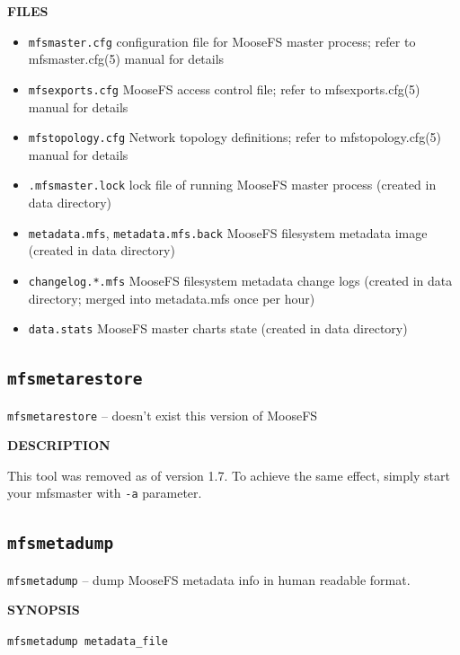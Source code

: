 \documentclass[a4paper,11pt,english]{report}
\def\code#1{\texttt{#1}}
\begin{document}
				\bigskip
				\textbf{FILES}
				\begin{itemize}
					\item \code{mfsmaster.cfg}
						configuration file for MooseFS master process; refer to
						mfsmaster.cfg(5) manual for details

					\item \code{mfsexports.cfg}
						MooseFS  access  control file; refer to mfsexports.cfg(5) manual
						for details

					\item \code{mfstopology.cfg}
						Network topology definitions; refer to mfstopology.cfg(5) manual
						for details

					\item \code{.mfsmaster.lock}
						lock  file  of  running  MooseFS master process (created in data
						directory)

					\item \code{metadata.mfs}, \code{metadata.mfs.back}
						MooseFS filesystem metadata image (created in data directory)

					\item \code{changelog.*.mfs}
						MooseFS filesystem metadata change logs (created in data
						directory; merged into metadata.mfs once per hour)

					\item \code{data.stats}
						MooseFS master charts state (created in data directory)
				\end{itemize}


			\subsection{\code{mfsmetarestore}}
				\code{mfsmetarestore} -- doesn't exist this version of MooseFS
				\bigskip
				
				\textbf{DESCRIPTION}
				
				This tool was removed as of version 1.7. To achieve the same effect, simply start your mfsmaster with \code{-a} parameter.
			
			\subsection{\code{mfsmetadump}}
				\code{mfsmetadump} -- dump MooseFS metadata info in human readable format.
				\bigskip
				
				\textbf{SYNOPSIS}
				
				\code{mfsmetadump metadata\_file}
				\bigskip
				
\end{document}
